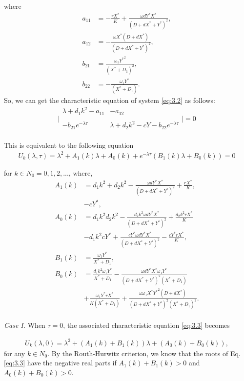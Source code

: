 \documentclass[10pt]{amsart}
\theoremstyle{definition}
\begin{document}
		where
		\begin{align*}
		a_{11} &= -\frac{rX^*}{K}+\frac{\omega d Y^*X^*}{(D+dX^*+Y^*)^2},\\
		a_{12} &= -\frac{\omega X^*(D+dX^*)}{(D+dX^*+Y^*)^2},\\
		b_{21} &= \frac{\omega_1 {Y^*}^2}{(X^*+D_1)^2},\\
		b_{22} &= -\frac{\omega_1 Y^*}{(X^*+D_1)}.
		\end{align*}
		So, we can get the characteristic equation of system \eqref{eq:3.2} as follows:
		$$\Bigg|\begin{array}{cc}
		{\displaystyle{\lambda + d_1k^2-a_{11}}} & {\displaystyle{-a_{12}}}\\ \\
		{\displaystyle{-b_{21}e^{-\lambda \tau}}} & {\displaystyle{\lambda + d_2k^2-cY-b_{22}e^{-\lambda \tau}}}\\
		\end{array}\Bigg|=0$$
		

This is equivalent to the following equation
\begin{eqnarray}\label{eq:3.3}
U_k(\lambda,\tau)=\lambda^2+A_1(k) \lambda +A_0(k) +e^{-\lambda \tau}(B_1(k) \lambda + B_0(k)) = 0
\end{eqnarray}

for $k \in N_0 ={0,1,2,...}$, where,
\begin{align*}
A_1(k)&=d_1 k^2+d_2 k^2-\frac{\omega dY^*X^*}{(D+dX^*+Y^*)^2}+\frac{rX^*}{K},\\
&-cY^*,\\
A_0(k)&=d_1 k^2 d_2 k^2- \frac{d_2 k^2 \omega dY^*X^*}{(D+dX^*+Y^*)^2}+\frac{d_2 k^2 rX^*}{K}\\
&-d_1k^2cY^*+\frac{cY^*\omega dY^*X^*}{(D+dX^*+Y^*)^2}-\frac{cY^*rX^*}{K},\\
B_1(k)&=\frac{\omega_1 Y^*}{X^*+D_1},\\
B_0(k)&=\frac{d_1k^2 \omega_1 Y^*}{X^*+D_1}-\frac{\omega d Y^*X^*\omega_1Y^*}{(D+dX^*+Y^*)^2(X^*+D_1)}\\
&+\frac{\omega_1Y^*rX^*}{K(X^*+D_1)}+\frac{\omega \omega_1X^*{Y^*}^2(D+dX^*)}{(D+dX^*+Y^*)^2(X^*+D_1)^2}.\\
\end{align*}

{\it Case I.} When $\tau=0$, the associated characteristic equation \eqref{eq:3.3} becomes

\begin{align}\label{eq:3.4}
U_k(\lambda,0)=\lambda^2+(A_1(k)+B_1(k))\lambda+(A_0(k)+B_0(k)),
\end{align}
for any $k \in N_0$. By the Routh-Hurwitz criterion, we know that the roots of Eq. \eqref{eq:3.3} have the negative real parts if $A_1(k)+B_1(k) > 0$ and $A_0(k)+B_0(k) > 0$.
\end{document}
